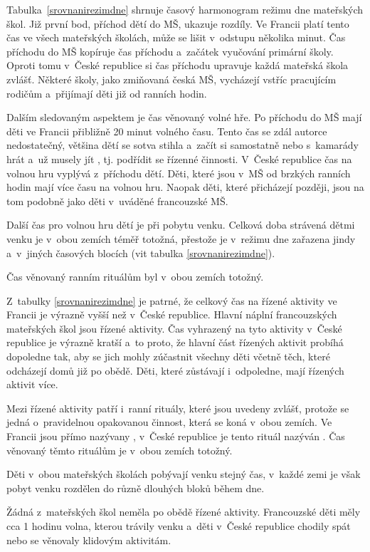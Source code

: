 	Tabulka~\ref{srovnanirezimdne} shrnuje časový harmonogram režimu dne mateřských škol. Již první bod, příchod dětí do MŠ, ukazuje rozdíly. Ve Francii platí tento čas ve všech mateřských školách, může se lišit v~odstupu několika minut. Čas příchodu do MŠ kopíruje čas příchodu a~začátek vyučování primární školy. Oproti tomu v~České republice si čas příchodu upravuje každá mateřská škola zvlášť. Některé školy, jako zmiňovaná česká MŠ, vycházejí vstříc pracujícím rodičům a~přijímají děti již od ranních hodin.

	Dalším sledovaným aspektem je čas věnovaný volné hře. Po příchodu do MŠ mají děti ve Francii přibližně 20 minut volného času. Tento čas se zdál autorce nedostatečný, většina dětí se sotva stihla  a~začít si samostatně nebo s~kamarády hrát a~už musely jít , tj. podřídit se řízenné činnosti. V~České republice čas na volnou hru vyplývá z~příchodu dětí. Děti, které jsou v~MŠ od brzkých ranních hodin mají více času na volnou hru. Naopak děti, které přicházejí později, jsou na tom podobně jako děti v~uváděné francouzské MŠ. 

	Další čas pro volnou hru dětí je při pobytu venku. Celková doba strávená dětmi venku je v~obou zemích téměř totožná, přestože je v~režimu dne zařazena jindy a~v~jiných časových blocích (vit tabulka \ref{srovnanirezimdne}).

	Čas věnovaný ranním rituálům byl v~obou zemích totožný. 

	Z~tabulky \ref{srovnanirezimdne} je patrné, že celkový čas na řízené aktivity ve Francii je výrazně vyšší než v~České republice. Hlavní náplní francouzských mateřských škol jsou řízené aktivity. Čas vyhrazený na tyto aktivity v~České republice je výrazně kratší a~to proto, že hlavní část řízených aktivit probíhá dopoledne tak, aby se jich mohly zúčastnit všechny děti včetně těch, které odcházejí domů již po obědě. Děti, které zůstávají i~odpoledne, mají řízených aktivit více. 

	Mezi řízené aktivity patří i~ranní rituály, které jsou uvedeny zvlášť, protože se jedná o~pravidelnou opakovanou činnost, která se koná v~obou zemích. Ve Francii jsou přímo nazývany , v~České republice je tento rituál nazýván . Čas věnovaný těmto rituálům je v~obou zemích totožný.

	Děti v~obou mateřských školách pobývají venku stejný čas, v~každé zemi je však pobyt venku rozdělen do různě dlouhých bloků během dne. 

	Žádná z~mateřských škol neměla po obědě řízené aktivity. Francouzské děti měly cca 1 hodinu volna, kterou trávily venku a~děti v~České republice chodily spát nebo se věnovaly klidovým aktivitám. 

